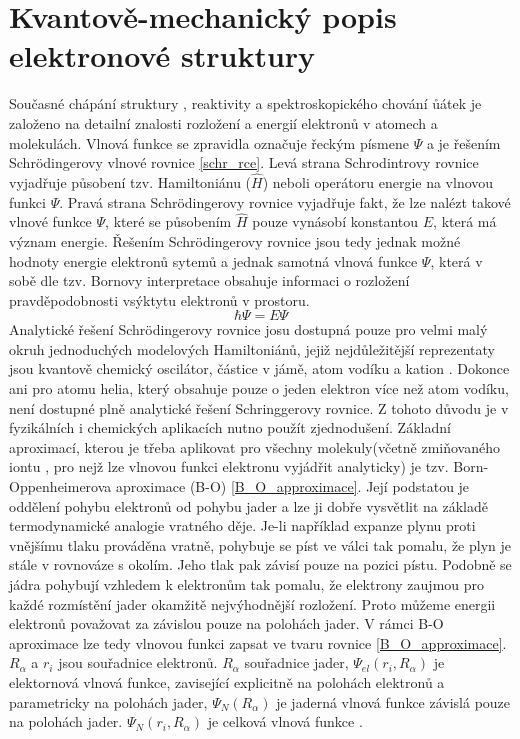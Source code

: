 \documentclass[
  digital, %
  table,   %
  lof,     %
  lot,     %
  oneside,
]{fithesis3}
\begin{document}
\section{Kvantově-mechanický popis elektronové struktury}
Současné chápání struktury , reaktivity a spektroskopického chování ůátek je založeno na detailní znalosti rozložení a energií elektronů v atomech a molekulách. Vlnová funkce se zpravidla označuje řeckým písmene $\Psi$ a je řešením Schrödingerovy vlnové rovnice \ref{schr_rce}. Levá strana Schrodintrovy rovnice vyjadřuje působení tzv. Hamiltoniánu ($\widehat{H}$) neboli operátoru energie na vlnovou funkci $\Psi$. Pravá strana Schrödingerovy rovnice vyjadřuje fakt, že lze nalézt takové vlnové funkce $\Psi$, které se působením $\widehat{H}$ pouze vynásobí konstantou $E$, která má význam energie. Řešením Schrödingerovy rovnice jsou tedy jednak možné hodnoty energie elektronů sytemů a jednak samotná vlnová funkce $\Psi$, která v sobě dle tzv. Bornovy interpretace obsahuje informaci o rozložení pravděpodobnosti vsýktytu elektronů v prostoru.
\begin{equation}
\hbar \Psi = E \Psi
\label{schr_rce}
\end{equation}
Analytické řešení Schrödingerovy rovnice josu dostupná pouze pro velmi malý okruh jednoduchých modelových Hamiltoniánů, jejiž nejdůležitější reprezentaty jsou kvantově chemický oscilátor, částice v jámě, atom vodíku a kation . Dokonce ani pro atomu helia, který obsahuje pouze o jeden elektron více než atom vodíku, není dostupné plně analytické řešení Schringgerovy rovnice.
Z tohoto důvodu je v fyzikálních i chemických aplikacích nutno použít zjednodušení. Základní aproximací, kterou je třeba aplikovat pro všechny molekuly(včetně zmiňovaného iontu , pro nejž lze vlnovou funkci elektronu vyjádřit analyticky) je tzv. Born-Oppenheimerova aproximace (B-O) \ref{B_O_approximace}. Její podstatou je oddělení pohybu elektronů od pohybu jader a lze ji dobře vysvětlit na základě termodynamické analogie vratného děje. Je-li například expanze plynu proti vnějšímu tlaku prováděna vratně, pohybuje se píst ve válci tak pomalu, že plyn je stále v rovnováze s okolím. Jeho tlak pak závisí pouze na pozici pístu. Podobně se jádra pohybují vzhledem k elektronům tak pomalu, že elektrony zaujmou pro každé rozmístění jader okamžitě nejvýhodnější rozložení. Proto můžeme energii elektronů považovat za závislou pouze na polohách jader. V rámci B-O aproximace lze tedy vlnovou funkci zapsat ve tvaru rovnice \ref{B_O_approximace}. $R_{\alpha}$ a $r_i$ jsou souřadnice elektronů. $R_{\alpha}$ souřadnice jader, $\Psi_{el}(r_i,R_{\alpha})$ je elektornová vlnová funkce, zavisející explicitně na polohách elektronů a parametricky na polohách jader, $\Psi_N(R_{\alpha})$ je jaderná vlnová funkce závislá pouze na polohách jader. $ \Psi_N(r_i, R_{\alpha}) $ je celková vlnová funkce \cite{lechamolecularmodeling}.
\end{document}
